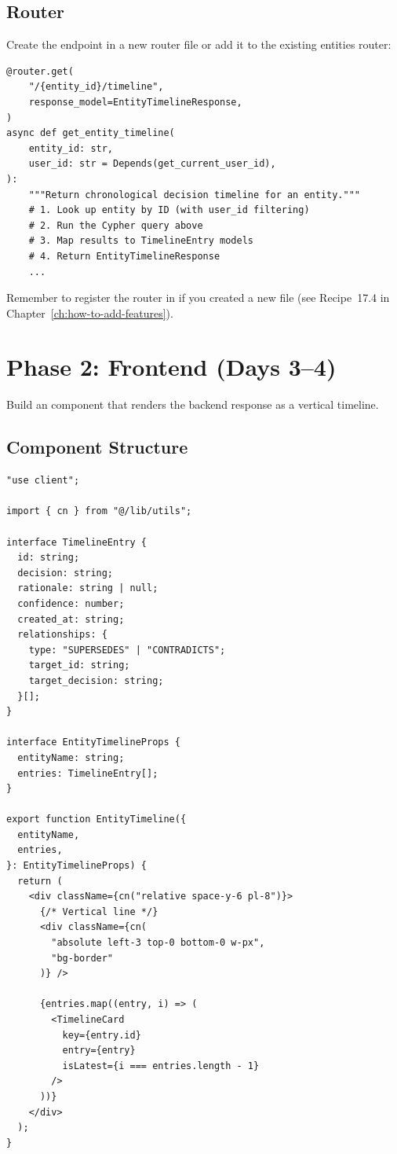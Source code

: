 \subsection{Router}

Create the endpoint in a new router file or add it to the existing
entities router:

\begin{lstlisting}[style=python, title=Timeline endpoint]
@router.get(
    "/{entity_id}/timeline",
    response_model=EntityTimelineResponse,
)
async def get_entity_timeline(
    entity_id: str,
    user_id: str = Depends(get_current_user_id),
):
    """Return chronological decision timeline for an entity."""
    # 1. Look up entity by ID (with user_id filtering)
    # 2. Run the Cypher query above
    # 3. Map results to TimelineEntry models
    # 4. Return EntityTimelineResponse
    ...
\end{lstlisting}

Remember to register the router in  if you created a
new file (see Recipe~17.4 in Chapter~\ref{ch:how-to-add-features}).


\section{Phase 2: Frontend (Days 3--4)}
\label{sec:starter-frontend}

Build an  component that renders the backend
response as a vertical timeline.

\subsection{Component Structure}

\begin{lstlisting}[style=typescript, title=EntityTimeline.tsx (skeleton)]
"use client";

import { cn } from "@/lib/utils";

interface TimelineEntry {
  id: string;
  decision: string;
  rationale: string | null;
  confidence: number;
  created_at: string;
  relationships: {
    type: "SUPERSEDES" | "CONTRADICTS";
    target_id: string;
    target_decision: string;
  }[];
}

interface EntityTimelineProps {
  entityName: string;
  entries: TimelineEntry[];
}

export function EntityTimeline({
  entityName,
  entries,
}: EntityTimelineProps) {
  return (
    <div className={cn("relative space-y-6 pl-8")}>
      {/* Vertical line */}
      <div className={cn(
        "absolute left-3 top-0 bottom-0 w-px",
        "bg-border"
      )} />

      {entries.map((entry, i) => (
        <TimelineCard
          key={entry.id}
          entry={entry}
          isLatest={i === entries.length - 1}
        />
      ))}
    </div>
  );
}
\end{lstlisting}

